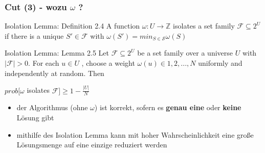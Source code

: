 \documentclass{beamer}
\begin{document}
\begin{frame}
\frametitle{Cut (3) - wozu $\omega$ ?}
\begin{block}{Isolation Lemma: Definition 2.4}
A function $\omega : U \rightarrow \mathbb{Z}$ isolates a set family $\mathcal{F} \subseteq 2^U$ if there is a unique $S' \in \mathcal{F}$ with $\omega (S')=min_{S \in \mathcal{S}} \omega(S)$
\end{block}
\begin{block}{Isolation Lemma: Lemma 2.5}
Let $\mathcal{F} \subseteq 2^U$ be a set family over a universe $U$ with $|\mathcal{F}| > 0$. For each $u \in U$ ,
choose a weight $\omega(u) \in {1, 2, . . . , N }$ uniformly and independently at random. Then
\begin{center}
$prob[\omega$ isolates $\mathcal{F}]\geq 1 - \frac{|U|}{N}$
\end{center}
\end{block}
\begin{itemize}
\item der Algorithmus (ohne $\omega$) ist korrekt, sofern es \textbf{genau eine} oder \textbf{keine} Lösung gibt
\item mithilfe des Isolation Lemma kann mit hoher Wahrscheinlichkeit eine große Lösungsmenge auf eine einzige reduziert werden
\end{itemize}

\end{frame}
\end{document}
